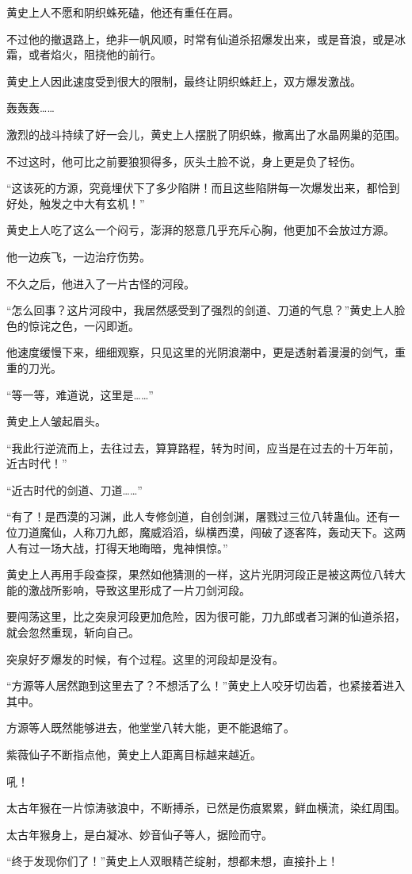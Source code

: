\begin{this_body}
黄史上人不愿和阴织蛛死磕，他还有重任在肩。

不过他的撤退路上，绝非一帆风顺，时常有仙道杀招爆发出来，或是音浪，或是冰霜，或者焰火，阻挠他的前行。

黄史上人因此速度受到很大的限制，最终让阴织蛛赶上，双方爆发激战。

轰轰轰……

激烈的战斗持续了好一会儿，黄史上人摆脱了阴织蛛，撤离出了水晶网巢的范围。

不过这时，他可比之前要狼狈得多，灰头土脸不说，身上更是负了轻伤。

“这该死的方源，究竟埋伏下了多少陷阱！而且这些陷阱每一次爆发出来，都恰到好处，触发之中大有玄机！”

黄史上人吃了这么一个闷亏，澎湃的怒意几乎充斥心胸，他更加不会放过方源。

他一边疾飞，一边治疗伤势。

不久之后，他进入了一片古怪的河段。

“怎么回事？这片河段中，我居然感受到了强烈的剑道、刀道的气息？”黄史上人脸色的惊诧之色，一闪即逝。

他速度缓慢下来，细细观察，只见这里的光阴浪潮中，更是透射着漫漫的剑气，重重的刀光。

“等一等，难道说，这里是……”

黄史上人皱起眉头。

“我此行逆流而上，去往过去，算算路程，转为时间，应当是在过去的十万年前，近古时代！”

“近古时代的剑道、刀道……”

“有了！是西漠的习渊，此人专修剑道，自创剑渊，屠戮过三位八转蛊仙。还有一位刀道魔仙，人称刀九郎，魔威滔滔，纵横西漠，闯破了逐客阵，轰动天下。这两人有过一场大战，打得天地晦暗，鬼神惧惊。”

黄史上人再用手段查探，果然如他猜测的一样，这片光阴河段正是被这两位八转大能的激战所影响，导致这里形成了一片刀剑河段。

要闯荡这里，比之突泉河段更加危险，因为很可能，刀九郎或者习渊的仙道杀招，就会忽然重现，斩向自己。

突泉好歹爆发的时候，有个过程。这里的河段却是没有。

“方源等人居然跑到这里去了？不想活了么！”黄史上人咬牙切齿着，也紧接着进入其中。

方源等人既然能够进去，他堂堂八转大能，更不能退缩了。

紫薇仙子不断指点他，黄史上人距离目标越来越近。

吼！

太古年猴在一片惊涛骇浪中，不断搏杀，已然是伤痕累累，鲜血横流，染红周围。

太古年猴身上，是白凝冰、妙音仙子等人，据险而守。

“终于发现你们了！”黄史上人双眼精芒绽射，想都未想，直接扑上！

\end{this_body}

